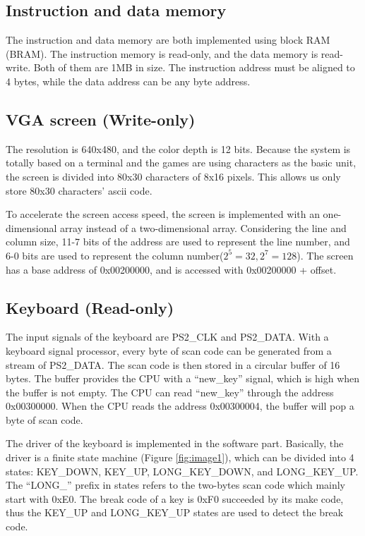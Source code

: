 \documentclass[
	a4paper, %
	11pt, %
]{CSUniSchoolLabReport}
\begin{document}
\subsection{Instruction and data memory}
The instruction and data memory are both implemented using block RAM (BRAM). The instruction memory is read-only, and the data memory is read-write. Both of them are 1MB in size. The instruction address must be aligned to 4 bytes, while the data address can be any byte address.
\subsection{VGA screen (Write-only)}
The resolution is 640x480, and the color depth is 12 bits. Because the system is totally based on a terminal and the games are using characters as the basic unit, the screen is divided into 80x30 characters of 8x16 pixels. This allows us only store 80x30 characters' ascii code.

To accelerate the screen access speed, the screen is implemented with an one-dimensional array instead of a two-dimensional array. Considering the line and column size, 11-7 bits of the address are used to represent the line number, and 6-0 bits are used to represent the column number($2^5=32,2^7=128$). The screen has a base address of 0x00200000, and is accessed with 0x00200000 + offset.
\subsection{Keyboard (Read-only)}
The input signals of the keyboard are PS2\_CLK and PS2\_DATA. With a keyboard signal processor, every byte of scan code can be generated from a stream of PS2\_DATA. The scan code is then stored in a circular buffer of 16 bytes. The buffer provides the CPU with a ``new\_key'' signal, which is high when the buffer is not empty. The CPU can read ``new\_key'' through the address 0x00300000. When the CPU reads the address 0x00300004, the buffer will pop a byte of scan code.

The driver of the keyboard is implemented in the software part. Basically, the driver is a finite state machine (Figure \ref{fig:image1}), which can be divided into 4 states: KEY\_DOWN, KEY\_UP, LONG\_KEY\_DOWN, and LONG\_KEY\_UP. The ``LONG\_'' prefix in states refers to the two-bytes scan code which mainly start with 0xE0. The break code of a key is 0xF0 succeeded by its make code, thus the KEY\_UP and LONG\_KEY\_UP states are used to detect the break code.
\end{document}
